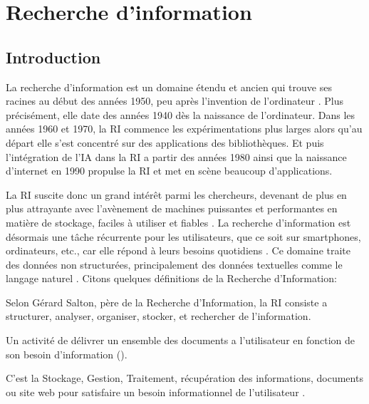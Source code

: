\chapter{Recherche d'information}
\section{Introduction}
La recherche d'information est un domaine étendu et ancien qui trouve ses racines au début des années 1950, peu après l'invention de l'ordinateur \citep{approche-semantique}. Plus précisément, elle date des années 1940 dès la naissance de l'ordinateur. Dans les années 1960 et 1970, la RI commence les expérimentations plus larges alors qu'au départ elle s'est concentré sur des applications des bibliothèques. Et puis l'intégration de l'IA dans la RI a partir des années 1980 ainsi que la naissance d'internet en 1990 propulse la RI et met en scène beaucoup d'applications. \citep{salton1989automatique}

La RI suscite donc un grand intérêt parmi les chercheurs, devenant de plus en plus attrayante avec l'avènement de machines puissantes et performantes en matière de stockage, faciles à utiliser et fiables \citep{evaluation-of-ir-system}. La recherche d'information est désormais une tâche récurrente pour les utilisateurs, que ce soit sur smartphones, ordinateurs, etc., car elle répond à leurs besoins quotidiens \citep{thesaurus-ir-web}. Ce domaine traite des données non structurées, principalement des données textuelles comme le langage naturel \citep{modern-ir}.
Citons quelques définitions de la Recherche d'Information:

\begin{definition}
    Selon Gérard Salton, père de la Recherche d'Information, la RI consiste a structurer, analyser, organiser, stocker, et rechercher de l'information. \citep{thesaurus-ir-web}
\end{definition}

\begin{definition}
    Un activité de délivrer un ensemble des documents a l'utilisateur en fonction de son besoin d'information (\cite{thesaurus-ir-web}).
\end{definition}

\begin{definition}
    C'est la Stockage, Gestion, Traitement, récupération des informations, documents ou site web pour satisfaire un besoin informationnel de l'utilisateur \citep{vsm-for-arabic-language}.
\end{definition}

